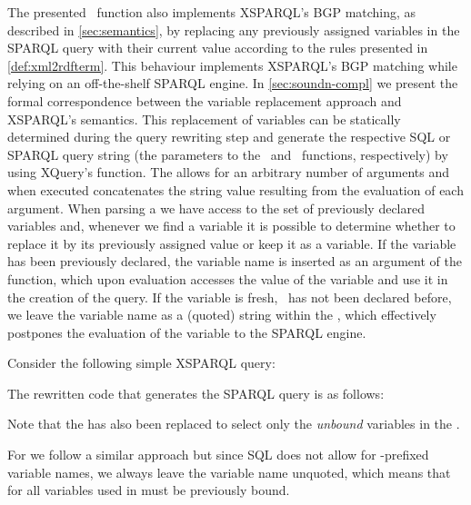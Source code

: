 The presented~ function also implements XSPARQL's \ac{BGP} matching, as described in
\cref{sec:semantics}, by replacing any previously assigned variables in the SPARQL query with their current value
according to the rules presented in \cref{def:xml2rdfterm}.
%
This behaviour implements XSPARQL's \ac{BGP} matching while relying on an off-the-shelf SPARQL engine.  In
\cref{sec:soundn-compl} we present the formal correspondence between the variable replacement approach and
XSPARQL's semantics.
%
This replacement of variables can be statically determined during the query rewriting step and generate the respective
\ac{SQL} or SPARQL query string (the parameters to the~ and~ functions,
respectively) by using XQuery's \concat function.  The \concat allows for an arbitrary number of arguments and when
executed concatenates the string value resulting from the evaluation of each argument.
%
When parsing a \SparqlForClause we have access to the set of previously declared variables and, whenever we find a
variable it is possible to determine whether to replace it by its previously assigned value or keep it as a variable.
%
If the variable has been previously declared, the variable name is inserted as an argument of the \concat function,
which upon evaluation accesses the value of the variable and use it in the creation of the \SELECT query.
%
If the variable is fresh, \ie~has not been declared before, we leave the variable name as a (quoted) string within the
\concat, which effectively postpones the evaluation of the variable to the SPARQL engine.
%

\begin{example}
  Consider the following simple XSPARQL query:
  
  The rewritten code that generates the SPARQL \SELECT query is as follows:
  
  Note that the  has also been replaced to select only the \emph{unbound} variables in the
  .
\end{example}
%
For  we follow a similar approach but since \ac{SQL} does not allow for \var{}-prefixed variable names,
we always leave the variable name unquoted, which means that for  all variables used in
 must be previously bound.


